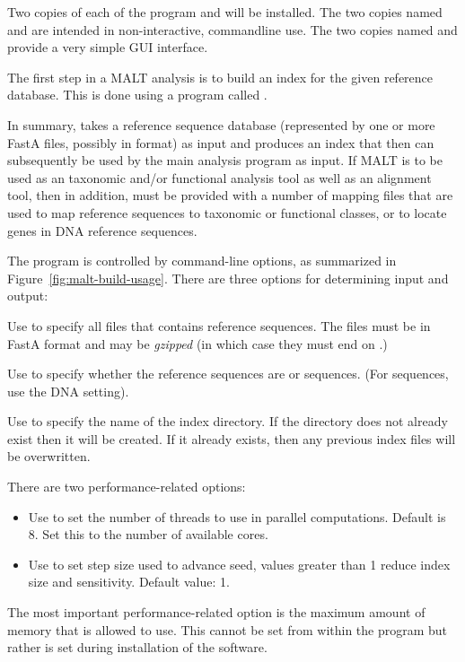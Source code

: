 \documentclass[11pt]{article}
\newcommand\MALT{{\sf MALT}\xspace}
\begin{document}
Two copies of each of the program  and  will be installed.
The two copies named  and  are intended in non-interactive, commandline use.
The two copies  named  and  provide a very simple GUI interface.





The first step in a \MALT analysis is to build an index for the given reference database. This is done
using  a program called .

In summary,  takes a reference sequence database (represented by
one or more FastA files, possibly in  format) as input and produces an index that then can  subsequently be used
by the main analysis program  as input.
If \MALT is to be used as an taxonomic and/or functional analysis tool as well as an alignment tool, then
in addition,   must be provided with a number of mapping files that are used
to map reference sequences to taxonomic or functional classes{, or to locate genes in DNA reference sequences}.

The  program is controlled by command-line options, as summarized in Figure~\ref{fig:malt-build-usage}. 
There are three options for determining input and output:
\begin{itemize}
\setlength{\itemindent}{30pt}
\item [\itt{--input}] Use to specify all files that contains reference sequences. The files must be in FastA format and
may be {\em gzipped} (in which case they must end on .) 
{
\item[\itt{--sequenceType}] Use to specify whether the reference sequences are  or  sequences.
(For  sequences, use the DNA setting).
}
\item[\itt{--index}] Use to specify the name of the index directory. If the directory does not already exist then it will be created.
If it already exists, then any previous index files will be overwritten.
\end{itemize}


There are two performance-related options:
\begin{itemize}
\setlength{\itemindent}{30pt}
\item[\itt{--threads}] Use to set the number of threads to use in parallel computations. Default is 8. Set this to
the number of available cores.
\item[\itt{--step}]  Use to set step size used to advance seed, values greater than 1 reduce index size and sensitivity. Default value: 1.
\end{itemize}
The most important performance-related option is the maximum amount of memory that 
is allowed to use. This cannot be set from within the program but rather is set during installation of the software.
\end{document}
